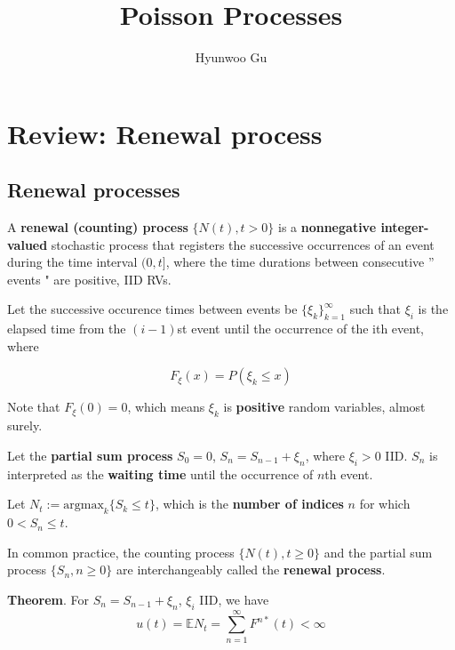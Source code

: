 \documentclass[12pt]{article}
\theoremstyle{nonumberbreak}
\begin{document}
\title{\textbf{Poisson Processes}}
\author{Hyunwoo Gu}
\date{}

\maketitle

\section*{Review: Renewal process}

\subsection*{Renewal processes}

A \textbf{renewal (counting) process} $\{N(t), t > 0\}$ is a \textbf{nonnegative integer-valued} stochastic process that registers the successive occurrences of an event during the time interval $(0, t]$, where the time durations between consecutive '' events " are positive, IID RVs. 

Let the successive occurence times between
events be $\{\xi_k\}_{k=1}^\infty$ such that $\xi_i$ is the elapsed time from the $(i-1)$st event until the occurrence of the ith event, where

$$
F_\xi (x) = P(\xi_k \le x)
$$

Note that $F_\xi(0) = 0$, which means $\xi_k$ is \textbf{positive} random variables, almost surely. 

Let the \textbf{partial sum process} $S_0 = 0$, $S_n = S_{n-1} + \xi_n$, where $\xi_i >0$ IID. $S_n$ is interpreted as the \textbf{waiting time} until the occurrence of $n$th event. 


Let $N_t := \mathrm{argmax}_k \{S_k \le t\}$, which is the \textbf{number of indices} $n$ for which $0 < S_n \le t$. 

In common practice, the counting process $\{N(t), t \ge 0 \}$ and the partial sum process $\{ S_n, n \ge 0 \}$ are interchangeably called the \textbf{renewal process}. 


\begin{theorem}
\textbf{Theorem}. For $S_n = S_{n-1} + \xi_n$, $\xi_i$ IID, we have
$$u(t) = \mathbb{E} N_t = \sum_{n=1}^\infty F^{n\ast} (t) < \infty$$
\end{theorem}
\end{document}
